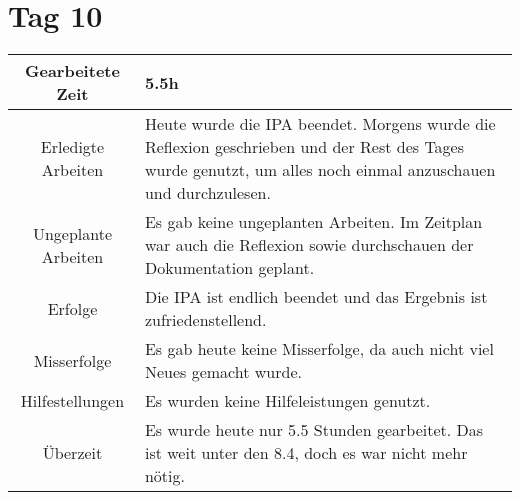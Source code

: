 \section{Tag 10}
\begin{tabularx}{\textwidth}[H]{|c|X|}
  \hline
  Gearbeitete Zeit & 5.5h \\ \hline
  Erledigte Arbeiten & Heute wurde die IPA beendet. Morgens wurde die Reflexion geschrieben und der Rest des Tages
  wurde genutzt, um alles noch einmal anzuschauen und durchzulesen. \\ \hline
  Ungeplante Arbeiten & Es gab keine ungeplanten Arbeiten. Im Zeitplan war auch die Reflexion sowie durchschauen
  der Dokumentation geplant. \\ \hline
  Erfolge & Die IPA ist endlich beendet und das Ergebnis ist zufriedenstellend. \\ \hline
  Misserfolge & Es gab heute keine Misserfolge, da auch nicht viel Neues gemacht wurde. \\ \hline
  Hilfestellungen & Es wurden keine Hilfeleistungen genutzt. \\ \hline
  Überzeit & Es wurde heute nur 5.5 Stunden gearbeitet. Das ist weit unter den 8.4, doch es war nicht mehr nötig. 
  \\ \hline
\end{tabularx}
